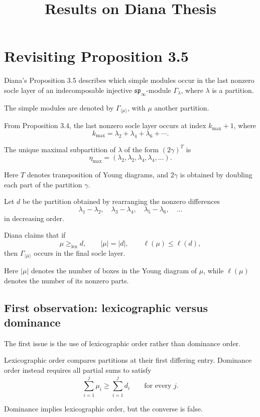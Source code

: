 \documentclass[11pt,a4paper]{article}
\title{Results on Diana Thesis}
\author{}
\date{}
\begin{document}
\maketitle

\section{Revisiting Proposition 3.5}

Diana's Proposition 3.5 describes which simple modules
occur in the last nonzero socle layer of an indecomposable
injective $\mathfrak{sp}_{\infty}$-module $\Gamma_\lambda$,
where $\lambda$ is a partition.

The simple modules are denoted by
$\Gamma_{\langle\mu\rangle}$, with $\mu$ another partition.

From Proposition 3.4, the last nonzero socle layer
occurs at index $k_{\max}+1$, where
\[
k_{\max}=\lambda_2+\lambda_4+\lambda_6+\cdots.
\]

The unique maximal subpartition of $\lambda$
of the form $(2\gamma)^T$ is
\[
\eta_{\max}
=(\lambda_2,\lambda_2,\lambda_4,\lambda_4,\ldots).
\]

Here $T$ denotes transposition of Young diagrams,
and $2\gamma$ is obtained by doubling each part
of the partition $\gamma$.

Let $d$ be the partition obtained by rearranging
the nonzero differences
\[
\lambda_1-\lambda_2,\quad
\lambda_3-\lambda_4,\quad
\lambda_5-\lambda_6,\quad\ldots
\]
in decreasing order.

Diana claims that if
\[
\mu\geq_{\mathrm{lex}}d,\qquad
|\mu|=|d|,\qquad
\ell(\mu)\leq\ell(d),
\]
then $\Gamma_{\langle\mu\rangle}$ occurs
in the final socle layer.

Here $|\mu|$ denotes the number of boxes in the
Young diagram of $\mu$, while $\ell(\mu)$ denotes
the number of its nonzero parts.

\subsection*{First observation: lexicographic versus dominance}

The first issue is the use of lexicographic order
rather than dominance order.

Lexicographic order compares partitions at their
first differing entry. Dominance order instead
requires all partial sums to satisfy
\[
\sum_{i=1}^{j}\mu_i
\geq
\sum_{i=1}^{j}d_i
\qquad\text{for every }j.
\]

Dominance implies lexicographic order, but the
converse is false.
\end{document}
